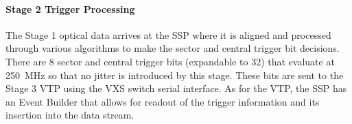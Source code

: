\paragraph{Stage 2 Trigger Processing}
The Stage 1 optical data arrives at the SSP where it is aligned and processed through various algorithms to make the sector and central trigger bit decisions. There are 8 sector and central trigger bits (expandable to 32) that evaluate at 250~MHz so that no jitter is introduced by this stage. These bits are sent to the Stage 3 VTP using the VXS switch serial interface. As for the VTP, the SSP has an Event Builder that allows for readout of the trigger information and its insertion into the data stream.
